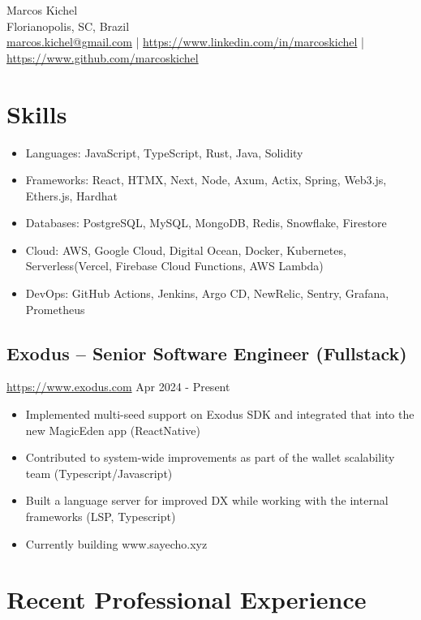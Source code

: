\documentclass[11pt, a4paper]{article}
\begin{document}
\begin{center}
    {\Huge Marcos Kichel}\\
    \vspace{0.2cm}
    Florianopolis, SC, Brazil\\
    \href{mailto:marcos.kichel@gmail.com}{marcos.kichel@gmail.com} | \href{https://www.linkedin.com/in/marcoskichel/}{https://www.linkedin.com/in/marcoskichel} | \href{https://www.github.com/marcoskichel}{https://www.github.com/marcoskichel}
\end{center}

\section*{Skills}
\begin{itemize}[noitemsep]
    \item Languages: JavaScript, TypeScript, Rust, Java, Solidity
    \item Frameworks: React, HTMX, Next, Node, Axum, Actix, Spring, Web3.js, Ethers.js, Hardhat
    \item Databases: PostgreSQL, MySQL, MongoDB, Redis, Snowflake, Firestore
    \item Cloud: AWS, Google Cloud, Digital Ocean, Docker, Kubernetes, Serverless(Vercel, Firebase Cloud Functions, AWS Lambda)
    \item DevOps: GitHub Actions, Jenkins, Argo CD, NewRelic, Sentry, Grafana, Prometheus
\end{itemize}

\subsection*{Exodus -- Senior Software Engineer (Fullstack)}
\href{https://www.exodus.com}{https://www.exodus.com} \hfill Apr 2024 - Present
\begin{itemize}[noitemsep]
    \item Implemented multi-seed support on Exodus SDK and integrated that into the new MagicEden app (ReactNative)
    \item Contributed to system-wide improvements as part of the wallet scalability team (Typescript/Javascript)
    \item Built a language server for improved DX while working with the internal frameworks (LSP, Typescript)
    \item Currently building www.sayecho.xyz
\end{itemize}

\section*{Recent Professional Experience}
\end{document}
